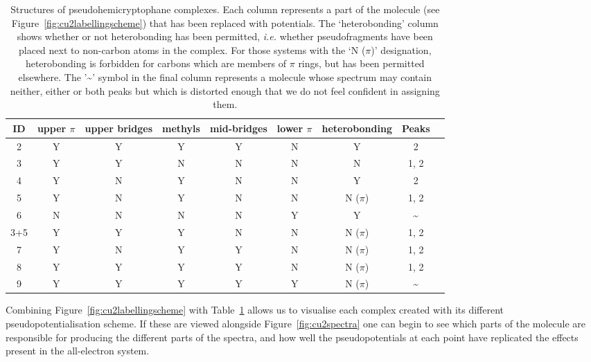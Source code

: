 \documentclass[aip,reprint,nofootinbib]{revtex4-1}
\begin{document}
\begin{table}
\begin{center}
\caption[Breakdown of pseudoCu(II)hemicryptophane structures.]{Structures of pseudohemicryptophane  complexes. Each column represents a part of the molecule (see Figure~\ref{fig:cu2labellingscheme}) that has been replaced with potentials. The `heterobonding' column shows whether or not heterobonding has been permitted, \emph{i.e.} whether pseudofragments have been placed next to non-carbon atoms in the complex. For those systems with the `N ($\pi$)' designation, heterobonding is forbidden for carbons which are members of $\pi$ rings, but has been permitted elsewhere. The '\textasciitilde' symbol in the final column represents a molecule whose spectrum may contain neither, either or both peaks but which is distorted enough that we do not feel confident in assigning them.}
\label{tab:cu2comppots}
\begin{tabular}{|c|c|c|c|c|c|c|c|c|}
\hline
ID & \multicolumn{1}{m{1cm}|}{\centering upper $\pi$} & \multicolumn{1}{m{1.5cm}|}{\centering upper bridges} & methyls & mid-bridges & \multicolumn{1}{m{1cm}|}{\centering lower $\pi$} & heterobonding & Peaks \\
\hline
2 & Y & Y & Y & Y & N & Y & 2 \\ 
3 & Y & Y & N & N & N & N & 1, 2 \\
4 & Y & N & Y & N & N & Y & 2 \\
5 & Y & N & Y & N & N & N ($\pi$) & 1, 2 \\
6 & N & N & N & N & Y &  Y & \textasciitilde \\
3+5 & Y & Y & Y & N & N & N ($\pi$) & 1, 2 \\
7 & Y & N & Y & Y & N & N ($\pi$) & 1, 2 \\
8 & Y & Y & Y & Y & N & N ($\pi$) & 1, 2 \\
9 & Y & Y & Y & Y & Y & N ($\pi$) & \textasciitilde \\
\hline
\end{tabular}
\end{center}
\end{table}

Combining Figure~\ref{fig:cu2labellingscheme} with  Table~\ref{tab:cu2comppots} allows us to visualise each complex created with its different pseudopotentialisation scheme. If these are viewed alongside Figure~\ref{fig:cu2spectra} one can begin to see which parts of the molecule are responsible for producing the different parts of the spectra, and how well the pseudopotentials at each point have replicated the effects present in the all-electron system.
\end{document}
